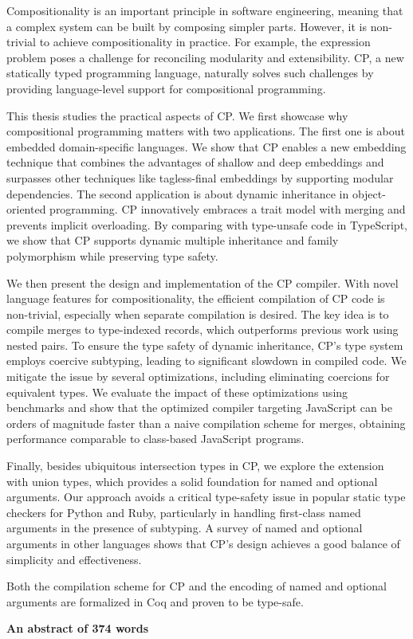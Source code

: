 \noindent
Compositionality is an important principle in software engineering, meaning that
a complex system can be built by composing simpler parts. However, it is
non-trivial to achieve compositionality in practice. For example, the expression
problem poses a challenge for reconciling modularity and extensibility. CP, a
new statically typed programming language, naturally solves such challenges by
providing language-level support for compositional programming.

This thesis studies the practical aspects of CP. We first showcase why
compositional programming matters with two applications. The first one is about
embedded domain-specific languages. We show that CP enables a new embedding
technique that combines the advantages of shallow and deep embeddings and
surpasses other techniques like tagless-final embeddings by supporting modular
dependencies. The second application is about dynamic inheritance in
object-oriented programming. CP innovatively embraces a trait model with merging
and prevents implicit overloading. By comparing with type-unsafe code in
TypeScript, we show that CP supports dynamic multiple inheritance and family
polymorphism while preserving type safety.

We then present the design and implementation of the CP compiler. With novel
language features for compositionality, the efficient compilation of CP code is
non-trivial, especially when separate compilation is desired. The key idea is to
compile merges to type-indexed records, which outperforms previous work using
nested pairs. To ensure the type safety of dynamic inheritance, CP's type system
employs coercive subtyping, leading to significant slowdown in compiled code. We
mitigate the issue by several optimizations, including eliminating coercions for
equivalent types. We evaluate the impact of these optimizations using benchmarks
and show that the optimized compiler targeting JavaScript can be orders of
magnitude faster than a naive compilation scheme for merges, obtaining
performance comparable to class-based JavaScript programs.

Finally, besides ubiquitous intersection types in CP, we explore the extension
with union types, which provides a solid foundation for named and optional
arguments. Our approach avoids a critical type-safety issue in popular static
type checkers for Python and Ruby, particularly in handling first-class named
arguments in the presence of subtyping. A survey of named and optional arguments
in other languages shows that CP's design achieves a good balance of simplicity
and effectiveness.

Both the compilation scheme for CP and the encoding of named and optional
arguments are formalized in Coq and proven to be type-safe.

\vspace{1.5\baselineskip}

\noindent\makebox[\linewidth]{\rule{0.7\textwidth}{0.4pt}}

\begin{center}
\textbf{An abstract of 374 words}
\end{center}
